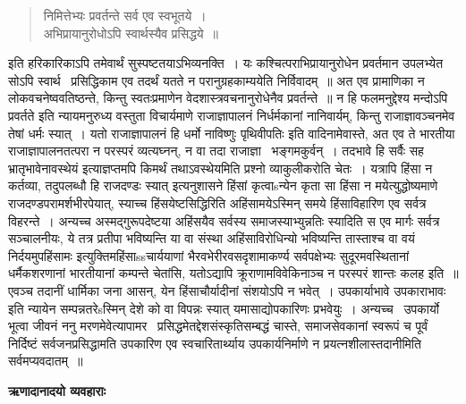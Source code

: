 \documentclass[11pt, openany]{book}
\begin{document}
\begin{quote}
{\qt निमित्तेभ्यः प्रवर्तन्ते सर्व एव स्वभूतये~।\\
अभिप्रायानुरोधोऽपि स्वार्थस्यैव प्रसिद्धये~॥}
\end{quote}

इति हरिकारिकाऽपि तमेवार्थं सुस्पष्टतयाऽभिव्यनक्ति~। यः कश्चित्पराभिप्रायानुरोधेन प्रवर्तमान उपलभ्येत सोऽपि स्वार्थ \textendash\ प्रसिद्धिकाम एव तदर्थं यतते न परानुग्रहकाम्ययेति निर्विवादम्~॥ अत एव प्रामाणिका न लोकवचनेष्ववतिष्ठन्ते, किन्तु स्वतःप्रमाणेन वेदशास्त्रवचनानुरोधेनैव प्रवर्तन्ते~॥ {\qt न हि फलमनुद्देश्य मन्दोऽपि प्रवर्तते} इति न्यायमनुरुध्य वस्तुता विचार्यमाणे राजाज्ञापालनं निर्धर्मकानां नानिवार्यम्, किन्तु राजाज्ञावञ्चनमेव तेषां धर्मः स्यात्~। यतो राजाज्ञापालनं हि धर्मो {\qt नाविष्णुः पृथिवीपतिः} इति वादिनामेवास्ते, अत एव ते भारतीया राजाज्ञापालनतत्परा न परस्परं व्यत्यघ्नन्, न वा तदा राजाज्ञा \textendash\ भङ्गमकुर्वन्~। तदभावे हि {\qt सर्वैः सह भ्रातृभावेनावस्थेयं} इत्याज्ञप्तमपि किमर्थं तथाऽवस्थेयमिति प्रश्नो व्याकुलीकरोति चेतः~। यत्रापि {\qt हिंसा न कर्तव्या, तदुपलब्धौ हि राजदण्डः स्यात्} इत्यनुशासने हिंसां कृत्वाsन्येन कृता सा हिंसा न मयेत्युद्धोष्यमाणे राजदण्डपरामर्शभीरपेयात्, स्याच्च हिंसयेष्टसिद्धिरिति अहिंसामयेऽस्मिन् समये हिंसाविहारिण एव सर्वत्र विहरन्ते~। अन्यच्च {\qt अस्मद्गुरूपदेष्टया अहिंसयैव सर्वस्य समाजस्याभ्युन्नतिः स्यादिति स एव मार्गः सर्वत्र सञ्चालनीयः, ये तत्र प्रतीपा भविष्यन्ति या वा संस्था अहिंसाविरोधिन्यो भविष्यन्ति तास्ताश्च वा वयं निर्दयमुपहिंसामः} इत्युक्तिमहिंसाssचार्ययाणां भैरवभेरीरवसदृशामाकर्ण्य सर्वपक्षेभ्यः सुदूरमवस्थितानां धर्मैकशरणानां भारतीयानां कम्पन्ते चेतांसि, यतोऽद्यापि क्रूराणामविवेकिनाञ्च न परस्परं शान्तः कलह इति~॥\\

एवञ्च तदानीं धार्मिका जना आसन्, येन हिंसाचौर्यादीनां संशयोऽपि न भवेत्~। {\qt उपकार्याभावे उपकाराभावः} इति न्यायेन सम्पन्नतरेsस्मिन् देशे को वा विपन्नः स्यात् यमासाद्योपकारिणः प्रभवेयुः~। अन्यच्च \textendash\ उपकार्यो भूत्वा जीवनं ननु मरणमेवेत्यापामर \textendash\ प्रसिद्धमेतद्देशसंस्कृतिसम्बद्धं चास्ते, समाजसेवकानां स्वरूपं च पूर्वं निर्दिष्टं सर्वजनप्रसिद्धामति उपकारिण एव स्वचारितार्थ्याय उपकार्यनिर्माणे न प्रयत्नशीलास्तदानीमिति सर्वमप्यवदातम्~॥ 

\begin{center}
\textbf{\Large ऋणादानादयो व्यवहाराः \textendash\ }
\end{center}
\end{document}

